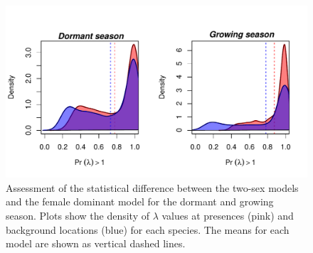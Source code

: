 \documentclass[12pt]{article}
\begin{document}
\begin{figure}[H]
  \begin{center}
    \includegraphics[width=0.99\linewidth]{Figures/Niche_overestimation.pdf}
  \caption{ Assessment of the statistical difference between the two-sex models and the female dominant model for the dormant and growing season. 
  Plots show the density of $\lambda$ values at presences (pink) and background locations (blue) for each species. 
  The means for each model are shown as vertical dashed lines. }
  \label{Sup:Niche_overestimation}
  \end{center}
\end{figure}
\end{document}
